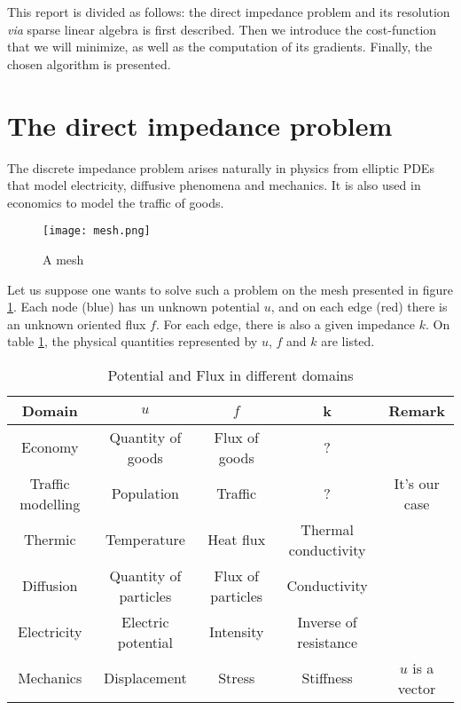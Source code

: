 \documentclass[11pt,a4paper]{article}  %
\begin{document}
This report is divided as follows: the direct impedance problem and its resolution \textit{via} sparse linear algebra is first described. Then we introduce the cost-function that we will minimize, as well as the computation of its gradients. Finally, the chosen algorithm is presented.

\section{The direct impedance problem}

The discrete impedance problem arises naturally in physics from elliptic PDEs that model electricity, diffusive phenomena and mechanics. It is also used in economics to model the traffic of goods.

\begin{figure}[ht]\centering
   \texttt{[image: mesh.png]}
   \caption{A mesh}
   \label{fig:mesh}
\end{figure}

Let us suppose one wants to solve such a problem on the mesh presented in figure \ref{fig:mesh}. Each node (blue) has un unknown potential $u$, and on each edge (red) there is an unknown oriented flux $f$. For each edge, there is also a given impedance $k$. On table \ref{tab:potNflux}, the physical quantities represented by $u$, $f$ and $k$ are listed.

\begin{table}[ht]
   \centering
   \begin{tabular}{ccccc}
      \toprule
      Domain & $u$ & $f$ & k & Remark \\
      \midrule
      Economy & Quantity of goods & Flux of goods & ? & \\
      Traffic modelling & Population & Traffic & ? & It's our case \\
      Thermic & Temperature & Heat flux & Thermal conductivity & \\
      Diffusion & Quantity of particles & Flux of particles & Conductivity & \\
      Electricity & Electric potential & Intensity & Inverse of resistance & \\
      Mechanics & Displacement & Stress & Stiffness & $u$ is a vector \\
      \bottomrule
   \end{tabular}
   \caption{Potential and Flux in different domains}
   \label{tab:potNflux}
\end{table}
\end{document}
